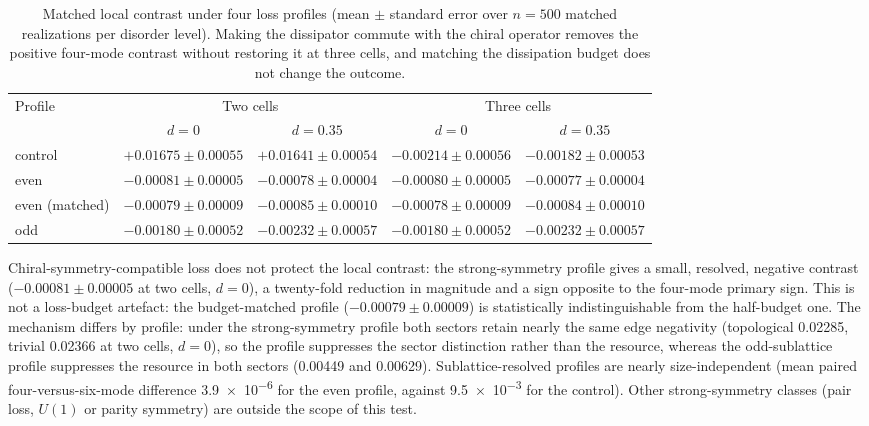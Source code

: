 \documentclass[aps,pra,preprint,superscriptaddress,amsmath,amssymb]{revtex4-2}
\begin{document}
\begin{table}[h]
\caption{Matched local contrast under four loss profiles (mean $\pm$ standard error over $n=\num{500}$ matched realizations per disorder level). Making the dissipator commute with the chiral operator removes the positive four-mode contrast without restoring it at three cells, and matching the dissipation budget does not change the outcome.}
\label{tab:chiralloss}
\begin{ruledtabular}
\footnotesize
\begin{tabular}{lcccc}
Profile & \multicolumn{2}{c}{Two cells} & \multicolumn{2}{c}{Three cells} \\
\cmidrule(lr){2-3}\cmidrule(lr){4-5}
 & $d=\num{0}$ & $d=\num{0.35}$ & $d=\num{0}$ & $d=\num{0.35}$ \\
\hline
control & $+\num{0.01675}\pm\num{0.00055}$ & $+\num{0.01641}\pm\num{0.00054}$ & $-\num{0.00214}\pm\num{0.00056}$ & $-\num{0.00182}\pm\num{0.00053}$ \\
even & $-\num{0.00081}\pm\num{0.00005}$ & $-\num{0.00078}\pm\num{0.00004}$ & $-\num{0.00080}\pm\num{0.00005}$ & $-\num{0.00077}\pm\num{0.00004}$ \\
even (matched) & $-\num{0.00079}\pm\num{0.00009}$ & $-\num{0.00085}\pm\num{0.00010}$ & $-\num{0.00078}\pm\num{0.00009}$ & $-\num{0.00084}\pm\num{0.00010}$ \\
odd & $-\num{0.00180}\pm\num{0.00052}$ & $-\num{0.00232}\pm\num{0.00057}$ & $-\num{0.00180}\pm\num{0.00052}$ & $-\num{0.00232}\pm\num{0.00057}$ \\
\end{tabular}
\end{ruledtabular}
\end{table}

Chiral-symmetry-compatible loss does not protect the local contrast: the strong-symmetry profile gives a small, resolved, negative contrast ($-\num{0.00081}\pm\num{0.00005}$ at two cells, $d=\num{0}$), a twenty-fold reduction in magnitude and a sign opposite to the four-mode primary sign. This is not a loss-budget artefact: the budget-matched profile ($-\num{0.00079}\pm\num{0.00009}$) is statistically indistinguishable from the half-budget one. The mechanism differs by profile: under the strong-symmetry profile both sectors retain nearly the same edge negativity (topological \num{0.02285}, trivial \num{0.02366} at two cells, $d=\num{0}$), so the profile suppresses the sector distinction rather than the resource, whereas the odd-sublattice profile suppresses the resource in both sectors (\num{0.00449} and \num{0.00629}). Sublattice-resolved profiles are nearly size-independent (mean paired four-versus-six-mode difference \num{3.9e-6} for the even profile, against \num{9.5e-3} for the control). Other strong-symmetry classes (pair loss, $U(1)$ or parity symmetry) are outside the scope of this test.
\end{document}
